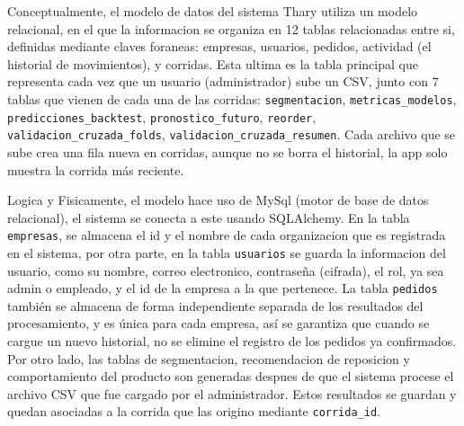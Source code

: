Conceptualmente, el modelo de datos del sistema Thary utiliza un modelo relacional, en el que la informacion se organiza en 12 tablas relacionadas entre si, definidas mediante claves foraneas: empresas, usuarios, pedidos, actividad (el historial de movimientos), y corridas. Esta ultima es la tabla principal que representa cada vez que un usuario (administrador) sube un CSV, junto con 7 tablas que vienen de cada una de las corridas: \texttt{segmentacion}, \texttt{metricas\_modelos}, \texttt{predicciones\_backtest}, \texttt{pronostico\_futuro}, \texttt{reorder}, \texttt{validacion\_cruzada\_folds}, \texttt{validacion\_cruzada\_resumen}. Cada archivo que se sube crea una fila nueva en corridas, aunque no se borra el historial, la app solo muestra la corrida más reciente.

Logica y Fisicamente, el modelo hace uso de MySql (motor de base de datos relacional), el sistema se conecta a este usando SQLAlchemy. En la tabla \texttt{empresas}, se almacena el id y el nombre de cada organizacion que es registrada en el sistema, por otra parte, en la tabla \texttt{usuarios} se guarda la informacion del usuario, como su nombre, correo electronico, contraseña (cifrada), el rol, ya sea admin o empleado, y el id de la empresa a la que pertenece. La tabla \texttt{pedidos} también se almacena de forma independiente separada de los resultados del procesamiento, y es única para cada empresa, así se garantiza que cuando se cargue un nuevo historial, no se elimine el registro de los pedidos ya confirmados. Por otro lado, las tablas de segmentacion, recomendacion de reposicion y comportamiento del producto son generadas despues de que el sistema procese el archivo CSV que fue cargado por el administrador. Estos resultados se guardan y quedan asociadas a la corrida que las origino mediante \texttt{corrida\_id}.

